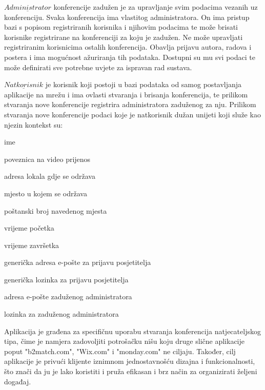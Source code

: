 		$\underline{Administrator}$ konferencije zadužen je za upravljanje svim podacima vezanih uz konferenciju. Svaka konferencija ima vlastitog administratora. On ima pristup bazi s popisom registriranih korisnika i njihovim podacima te može brisati korisnike registrirane na konferenciji za koju je zadužen. Ne može upravljati registriranim korisnicima ostalih konferencija. Obavlja prijavu autora, radova i postera i ima mogućnost ažuriranja tih podataka. Dostupni su mu svi podaci te može definirati sve potrebne uvjete za ispravan rad sustava.
		
		$\underline{Natkorisnik}$ je korisnik koji postoji u bazi podataka od samog postavljanja aplikacije na mrežu i ima ovlasti stvaranja i brisanja konferencija, te prilikom stvaranja nove konferencije registrira administratora zaduženog za nju. Prilikom stvaranja nove konferencije podaci koje je natkorisnik dužan unijeti koji služe kao njezin kontekst su:
		\begin{packed_item}
			\item ime
			\item poveznica na video prijenos
			\item adresa lokala gdje se održava
			\item mjesto u kojem se održava
			\item poštanski broj navedenog mjesta
			\item vrijeme početka
			\item vrijeme završetka
			\item generička adresa e-pošte za prijavu posjetitelja
			\item generička lozinka za prijavu posjetitelja
			\item adresa e-pošte zaduženog administratora
			\item lozinka za zaduženog administratora
		\end{packed_item}
		
		Aplikacija je građena za specifičnu uporabu stvaranja konferencija natjecateljskog tipa, čime je namjera zadovoljiti potrošačku nišu koju druge slične aplikacije poput "b2match.com", "Wix.com" i "monday.com" ne ciljaju. Također, cilj aplikacije je privući klijente iznimnom jednostavnošću dizajna i funkcionalnosti, što znači da ju je lako koristiti i pruža efikasan i brz način za organizirati željeni događaj.

